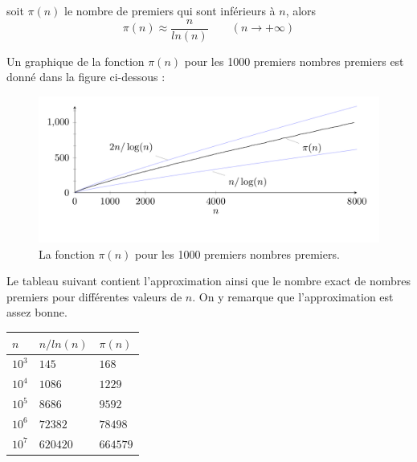 		\vspace{-1.5em}\begin{adjustwidth}{1.5cm}{1.5cm} 
		\begin{Th}
			soit $\pi(n)$ le nombre de premiers qui sont inférieurs à $n$, alors
			\[\pi(n) \approx \frac{n}{ln(n)} \quad \quad (n \to +\infty)\]
		\end{Th}
		\end{adjustwidth}\vspace{0.5em}
		
	Un graphique de la fonction $\pi(n)$ pour les 1000 premiers nombres premiers est donné dans la figure ci-dessous :
	\begin{figure}[H]
		\begin{center}\includegraphics[scale=0.4]{freqPremiers.png}\end{center}\vspace{-3em}
		\caption{La fonction $\pi(n)$ pour les 1000 premiers nombres premiers.}\label{fig:M3}
	\end{figure}
	
	Le tableau suivant contient l'approximation ainsi que le nombre exact de nombres premiers pour différentes valeurs de $n$. On y remarque que l'approximation est assez bonne.
	\begin{table}[H]\begin{center}
		\begin{tabular}{|lll|}
		\hline
		$n$  & $n/ln(n)$ & $\pi(n)$     \\ \hline
		$10^{3}$ & $145$     & $168$     \\
		$10^{4}$ & $1 086$   & $1 229$   \\
		$10^{5}$ & $8 686$   & $9 592$   \\
		$10^{6}$ & $72 382$  & $78 498$  \\
		$10^{7}$ & $620 420$ & $664 579$ \\ \hline
		\end{tabular}
	\end{center}\end{table}
	
